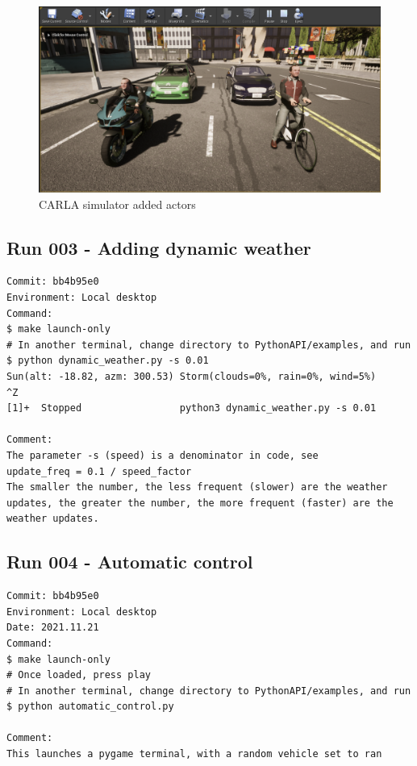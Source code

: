 \begin{figure}[h!]
\centering
\includegraphics[width=\textwidth]{Figures/biker-cyclist.png}
\caption{CARLA simulator added actors}
\label{fig:biker-cyclist}
\end{figure}


\subsection{Run 003 - Adding dynamic weather}
\label{app_res:003}
\begin{verbatim}
Commit: bb4b95e0
Environment: Local desktop
Command:
$ make launch-only
# In another terminal, change directory to PythonAPI/examples, and run
$ python dynamic_weather.py -s 0.01
Sun(alt: -18.82, azm: 300.53) Storm(clouds=0%, rain=0%, wind=5%)            ^Z
[1]+  Stopped                 python3 dynamic_weather.py -s 0.01

Comment:
The parameter -s (speed) is a denominator in code, see
update_freq = 0.1 / speed_factor
The smaller the number, the less frequent (slower) are the weather updates, the greater the number, the more frequent (faster) are the weather updates.
\end{verbatim}

\subsection{Run 004 - Automatic control}
\label{app_res:004}
\begin{verbatim}
Commit: bb4b95e0
Environment: Local desktop
Date: 2021.11.21
Command:
$ make launch-only
# Once loaded, press play
# In another terminal, change directory to PythonAPI/examples, and run
$ python automatic_control.py

Comment:
This launches a pygame terminal, with a random vehicle set to ran
\end{verbatim}

